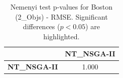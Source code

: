 \begin{table}[h!]
\centering
\scriptsize
\begin{tabular}{lc}
\toprule
 & NT\_NSGA-II \\
\midrule
\textbf{NT\_NSGA-II} & 1.000 \\
\bottomrule
\end{tabular}
\caption{Nemenyi test p-values for Boston (2_Objs) - RMSE. Significant differences ($p < 0.05$) are highlighted.}
\label{tab:nemenyi_nemenyi_Boston_2_Objs_Test_RMSE}
\end{table}